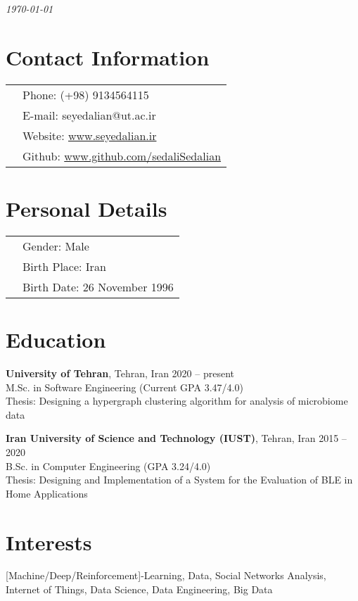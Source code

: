 \documentclass[margin,line]{res}
\begin{document}
 \hfill {\em \today}

\begin{resume}
\section{\sc Contact Information}
\vspace{.05in}
\begin{tabular}{@{}p{3.5in}p{3in}}
& {Phone:}  (+98) 9134564115 \\
& {E-mail:}  seyedalian@ut.ac.ir\\
& {Website:} \url{www.seyedalian.ir}\\
& {Github:}  \url{www.github.com/sedaliSedalian}

\end{tabular}
\section{\sc Personal Details}
\begin{tabular}{@{}p{3.5in}p{3in}}
	& {Gender:}  Male \\
	& {Birth Place:}  Iran \\
	& {Birth Date:}  26 November 1996 \\
\end{tabular}

\section{\sc Education}
{\bf University of Tehran}, Tehran, Iran \hfill 2020 -- present\\
M.Sc. in Software Engineering \hfill(Current GPA 3.47/4.0)\\
Thesis: Designing a hypergraph clustering algorithm for analysis of microbiome data


{\bf Iran University of  Science and Technology (IUST)}, Tehran, Iran \hfill 2015 -- 2020\\
B.Sc. in Computer Engineering \hfill(GPA 3.24/4.0)\\
Thesis: Designing and Implementation of a System for the Evaluation of BLE in Home Applications


\section{\sc Interests}
[Machine/Deep/Reinforcement]-Learning, Data, Social Networks Analysis,  Internet of Things, Data Science,  Data Engineering, Big Data

\end{resume}
\end{document}
